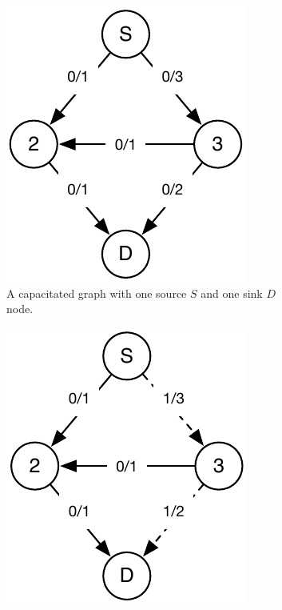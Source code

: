 \begin{figure}[htp] %
\graphicspath{{chapters/chapter4/images/alternated_move_and_push/}}

\begin{subfigure}[t]{0.30\textwidth}
  \centering
  \includegraphics[width=\linewidth,height=\linewidth, keepaspectratio]{alternated_move_and_push1.pdf}
  \caption{A capacitated graph with one source $S$ and one sink $D$ node.}\label{fig:alternated_move_and_push_fig1}
\end{subfigure}
\quad
\begin{subfigure}[t]{0.30\textwidth}
  \centering
  \includegraphics[width=\linewidth,height=\linewidth, keepaspectratio]{alternated_move_and_push2.pdf}

\end{subfigure}
\end{figure}
